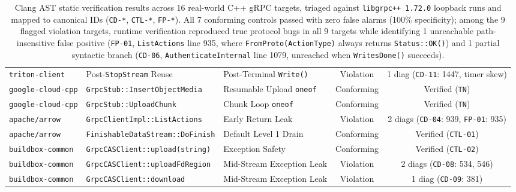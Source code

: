 \documentclass[11pt,a4paper]{article}
\begin{document}
\begin{table}[htbp]
\begin{tabular}{@{}lllcc@{}}
\texttt{triton-client} & Post-\texttt{StopStream} Reuse & Post-Terminal \texttt{Write()} & Violation & 1 diag (\texttt{CD-11}: 1447, timer skew) \\
\texttt{google-cloud-cpp} & \texttt{GrpcStub::InsertObjectMedia} & Resumable Upload \texttt{oneof} & Conforming & Verified (\texttt{TN}) \\
\texttt{google-cloud-cpp} & \texttt{GrpcStub::UploadChunk} & Chunk Loop \texttt{oneof} & Conforming & Verified (\texttt{TN}) \\
\texttt{apache/arrow} & \texttt{GrpcClientImpl::ListActions} & Early Return Leak & Violation & 2 diags (\texttt{CD-04}: 939, \texttt{FP-01}: 935) \\
\texttt{apache/arrow} & \texttt{FinishableDataStream::DoFinish} & Default Level 1 Drain & Conforming & Verified (\texttt{CTL-01}) \\
\texttt{buildbox-common} & \texttt{GrpcCASClient::upload(string)} & Exception Safety & Conforming & Verified (\texttt{CTL-02}) \\
\texttt{buildbox-common} & \texttt{GrpcCASClient::uploadFdRegion} & Mid-Stream Exception Leak & Violation & 2 diags (\texttt{CD-08}: 534, 546) \\
\texttt{buildbox-common} & \texttt{GrpcCASClient::download} & Mid-Stream Exception Leak & Violation & 1 diag (\texttt{CD-09}: 381) \\
\bottomrule
\end{tabular}
\caption{Clang AST static verification results across 16 real-world C++ gRPC targets, triaged against \texttt{libgrpc++ 1.72.0} loopback runs and mapped to canonical IDs (\texttt{CD-*}, \texttt{CTL-*}, \texttt{FP-*}). All 7 conforming controls passed with zero false alarms (100\% specificity); among the 9 flagged violation targets, runtime verification reproduced true protocol bugs in all 9 targets while identifying 1 unreachable path-insensitive false positive (\texttt{FP-01}, \texttt{ListActions} line 935, where \texttt{FromProto(ActionType)} always returns \texttt{Status::OK()}) and 1 partial syntactic branch (\texttt{CD-06}, \texttt{AuthenticateInternal} line 1079, unreached when \texttt{WritesDone()} succeeds).}
\label{tab:evaluation-matrix}
\end{table}
\end{document}
